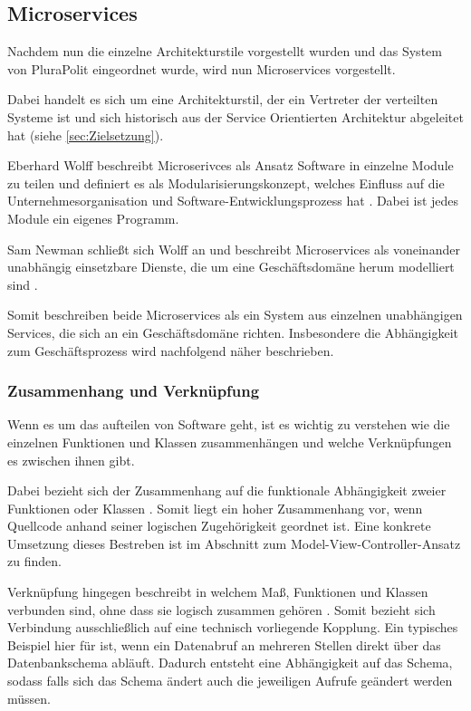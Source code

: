 \subsection{Microservices}

Nachdem nun die einzelne Architekturstile vorgestellt wurden und das System von PluraPolit eingeordnet wurde, wird nun Microservices vorgestellt.

Dabei handelt es sich um eine Architekturstil, der ein Vertreter der verteilten Systeme ist und sich historisch aus der Service Orientierten Architektur abgeleitet hat (siehe \cref{sec:Zielsetzung}).

Eberhard Wolff beschreibt Microserivces als Ansatz Software in einzelne Module zu teilen und definiert es als Modularisierungskonzept, welches Einfluss auf die Unternehmesorganisation und Software-Entwicklungsprozess hat \parencite[vgl.][Kap. 1.1]{wolff_microservices_2018}. Dabei ist jedes Module ein eigenes Programm.

Sam Newman schließt sich Wolff an und beschreibt Microservices als voneinander unabhängig einsetzbare Dienste, die um eine Geschäftsdomäne herum modelliert sind \parencite[vgl.][Kap. 2.1]{newman_monolith_2019}.

Somit beschreiben beide Microservices als ein System aus einzelnen unabhängigen Services, die sich an ein Geschäftsdomäne richten. Insbesondere die Abhängigkeit zum Geschäftsprozess wird nachfolgend näher beschrieben.

\subsubsection{Zusammenhang und Verknüpfung}

Wenn es um das aufteilen von Software geht, ist es wichtig zu verstehen wie die einzelnen Funktionen und Klassen zusammenhängen und welche Verknüpfungen es zwischen ihnen gibt.

Dabei bezieht sich der Zusammenhang auf die funktionale Abhängigkeit zweier Funktionen oder Klassen \parencite[vgl.][Kap. 2.3.1]{newman_monolith_2019}. Somit liegt ein hoher Zusammenhang vor, wenn Quellcode anhand seiner logischen Zugehörigkeit geordnet ist. Eine konkrete Umsetzung dieses Bestreben ist im Abschnitt zum Model-View-Controller-Ansatz zu finden.

Verknüpfung hingegen beschreibt in welchem Maß, Funktionen und Klassen verbunden sind, ohne dass sie logisch zusammen gehören \parencite[vgl.][Kap. 2.3.2]{newman_monolith_2019}. Somit bezieht sich Verbindung ausschließlich auf eine technisch vorliegende Kopplung. Ein typisches Beispiel hier für ist, wenn ein Datenabruf an mehreren Stellen direkt über das Datenbankschema abläuft. Dadurch entsteht eine Abhängigkeit auf das Schema, sodass falls sich das Schema ändert auch die jeweiligen Aufrufe geändert werden müssen.

